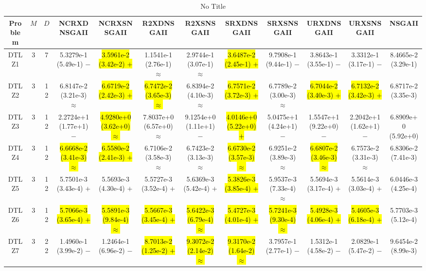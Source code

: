 \documentclass[journal]{IEEEtran}
\begin{document}
\begin{table*}[htbp]
\renewcommand{\arraystretch}{1.2}
\centering
\caption{No Title}
\begin{tabular}{cccccccccccc}
\toprule
Problem&$M$&$D$&NCRXDNSGAII&NCRXSNSGAII&R2XDNSGAII&R2XSNSGAII&SRXDNSGAII&SRXSNSGAII&URXDNSGAII&URXSNSGAII&NSGAII\\
\midrule
\multirow{1}{*}{DTLZ1}&3&7&5.3279e-1 (5.49e-1) $-$&\hl{3.5961e-2 (3.42e-2) $+$}&1.1541e-1 (2.76e-1) $\approx$&2.9744e-1 (3.07e-1) $\approx$&\hl{3.6487e-2 (2.45e-1) $+$}&9.7908e-1 (9.44e-1) $-$&3.8643e-1 (3.55e-1) $-$&3.3312e-1 (3.17e-1) $-$&8.4665e-2 (3.29e-1)\\
\hline
\multirow{1}{*}{DTLZ2}&3&12&6.8147e-2 (3.21e-3) $\approx$&\hl{6.6719e-2 (2.42e-3) $+$}&\hl{6.7472e-2 (3.65e-3) $\approx$}&6.8394e-2 (4.10e-3) $\approx$&\hl{6.7571e-2 (3.72e-3) $+$}&6.7789e-2 (3.00e-3) $\approx$&\hl{6.7044e-2 (3.40e-3) $+$}&\hl{6.7132e-2 (3.42e-3) $+$}&6.8717e-2 (3.35e-3)\\
\hline
\multirow{1}{*}{DTLZ3}&3&12&2.2724e+1 (1.77e+1) $-$&\hl{4.9280e+0 (3.62e+0) $\approx$}&7.8037e+0 (6.57e+0) $\approx$&9.1254e+0 (1.11e+1) $-$&\hl{4.0146e+0 (5.22e+0) $+$}&5.0475e+1 (4.24e+1) $-$&1.5547e+1 (9.22e+0) $-$&2.2042e+1 (1.62e+1) $-$&6.8909e+0 (5.92e+0)\\
\hline
\multirow{1}{*}{DTLZ4}&3&12&\hl{6.6668e-2 (3.41e-3) $\approx$}&\hl{6.5580e-2 (2.41e-3) $+$}&6.7106e-2 (3.58e-3) $\approx$&6.7423e-2 (3.13e-3) $\approx$&\hl{6.6730e-2 (3.57e-3) $\approx$}&6.9251e-2 (3.89e-3) $\approx$&\hl{6.6807e-2 (3.46e-3) $\approx$}&6.7573e-2 (3.31e-3) $\approx$&6.8306e-2 (7.41e-3)\\
\hline
\multirow{1}{*}{DTLZ5}&3&12&5.7501e-3 (3.43e-4) $+$&5.5693e-3 (4.30e-4) $+$&5.5727e-3 (3.52e-4) $+$&5.6369e-3 (5.42e-4) $+$&\hl{5.3826e-3 (3.85e-4) $+$}&5.9537e-3 (7.33e-4) $\approx$&5.5694e-3 (3.17e-4) $+$&5.5614e-3 (3.03e-4) $+$&6.0446e-3 (4.25e-4)\\
\hline
\multirow{1}{*}{DTLZ6}&3&12&\hl{5.7066e-3 (3.65e-4) $+$}&\hl{5.5891e-3 (9.84e-4) $\approx$}&\hl{5.5667e-3 (3.45e-4) $+$}&\hl{5.6422e-3 (6.79e-4) $\approx$}&\hl{5.4727e-3 (4.01e-4) $+$}&\hl{5.7241e-3 (9.30e-4) $\approx$}&\hl{5.4928e-3 (4.06e-4) $+$}&\hl{5.4605e-3 (6.18e-4) $+$}&5.7703e-3 (5.12e-4)\\
\hline
\multirow{1}{*}{DTLZ7}&3&22&1.4960e-1 (3.99e-2) $-$&1.2464e-1 (6.96e-2) $-$&\hl{8.7013e-2 (1.25e-2) $+$}&\hl{9.3072e-2 (2.14e-2) $\approx$}&\hl{9.3170e-2 (1.64e-2) $\approx$}&3.7957e-1 (2.77e-1) $-$&1.5312e-1 (4.58e-2) $-$&2.0829e-1 (5.47e-2) $-$&9.6454e-2 (8.99e-3)\\

\end{tabular}
\end{table*}
\end{document}
